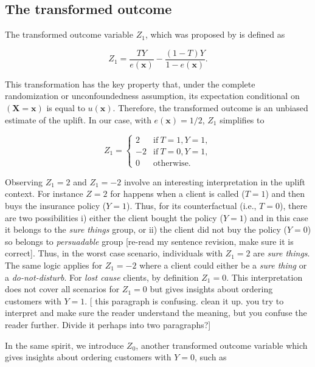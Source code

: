 \documentclass{article}
\def\X{\mathbf X}
\def\x{\mathbf x}
\def \vahid {\color{magenta}}
\begin{document}
\subsection{The transformed outcome}
\label{sec:transformed_outcome}

The transformed outcome variable $Z_1$, which was proposed by \citep{athey2015machine} is defined as  

\begin{equation}
    Z_1 =  \frac{T Y}{e(\x)} - \frac{(1 - T) Y}{1 - e(\x)}.
    \label{eq:transformed_outcome}
\end{equation}

This transformation has the key property that, under the complete randomization or unconfoundedness assumption, its expectation conditional on $(\X=\x)$ is equal to $u(\x)$. Therefore, the transformed outcome is an unbiased estimate of the uplift. In our case, with $e(\x) = 1/2$, $Z_1$ simplifies to

\[ Z_1 = \left\{ \begin{array}{cc}
      2 & \mathrm{if}~T=1, Y=1, \\
      -2 & \mathrm{if}~T=0, Y=1, \\
      0 & \mathrm{otherwise.} 
   \end{array} \right.
\]

Observing $Z_1=2$ and $Z_1=-2$ involve an interesting interpretation  in the uplift context. For instance $Z=2$ for  happens when a client is called ($T = 1$) and then buys the insurance policy ($Y = 1$). Thus, for its counterfactual (i.e., $T = 0$), there are two possibilities i) either the client bought  the policy ($Y = 1$) and in this case it belongs to the \textit{sure things} group, or ii) the client did not buy the policy ($Y = 0$) so belongs to  \textit{persuadable} group {\vahid [re-read my sentence revision, make sure it is correct]}. Thus, in the worst case scenario, individuals with $Z_1 = 2$ are \textit{sure things}. The same logic applies for $Z_1 = -2$ where a client could either be a \textit{sure thing} or a \textit{do-not-disturb}. For \textit{lost cause} clients, by definition $Z_1 = 0$. This interpretation does not cover all scenarios for $Z_1=0$ but gives insights about ordering customers with $Y=1$. {\vahid [ this paragraph is confusing. clean it up. you try to interpret and make sure the reader understand the meaning, but you confuse the reader further. Divide it perhaps into two paragraphs?]}


In the same spirit, we introduce $Z_0$, another transformed outcome variable which gives insights about ordering customers with $Y=0$, such as
\end{document}
